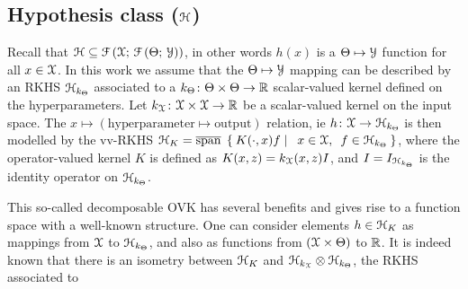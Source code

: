 \subsection{Hypothesis class ($\mathcal{H}$)} \label{sec:H}
Recall that $\mathcal{H} \subseteq
\mathcal{F}\left(\mathcal{X};\,\mathcal{F}\left(
\Theta;\,\mathcal{Y}\right)\right)$, in other words $h(x)$ is a
$\Theta \mapsto \mathcal{Y}$ function for all $x \in
\mathcal{X}$.  In this work we assume that
the $\Theta \mapsto \mathcal{Y}$ mapping can be described by an
\acs{RKHS} $\mathcal{H}_{k_{\Theta}}$ associated to a
$k_{\Theta} \colon \Theta \times
\Theta \to \mathbb{R}$ scalar-valued kernel defined on the
hyperparameters.  Let $k_{\mathcal{X}} \colon \mathcal{X} \times \mathcal{X} \to \mathbb{R}$ be a
scalar-valued kernel on the input space. The  $x  \mapsto
(\text{hyperparameter} \mapsto \text{output})$ relation, \acs{ie} $h\colon
\mathcal{X} \to \mathcal{H}_{k_{\Theta}}$ is then modelled by the
\acl{vv-RKHS} $\hypothesisspace_K = \lspan \Set{K(\cdot,x)f |\enskip x \in
\mcX,\enskip f \in \hypothesisspace_{k_{\hyperparameterspace}}}$, where the
operator-valued kernel $K$ is defined as $K(x,z)= k_{\mathcal{X}}(x,z) I$, and
$I=I_{\mathcal{H}_{k_{\Theta}}}$ is the identity operator on
$\mathcal{H}_{k_{\Theta}}$. \par
%
This so-called decomposable \acl{OVK} has several benefits and gives rise to a
function space with a well-known structure. One can consider elements $h \in
\mathcal{H}_K$ as mappings from $\mathcal{X}$ to $\mathcal{H}_{k_{\Theta}}$, and
also as functions from $(\mathcal{X} \times \Theta)$ to $\mathbb{R}$. It is indeed known
that there is an isometry between $\mathcal{H}_K$ and $\mathcal{H}_{k_{\mathcal{X}}} \otimes
\mathcal{H}_{k_{\Theta}}$, the \ac{RKHS} associated to

